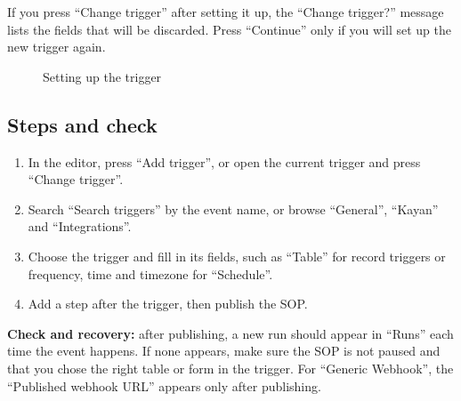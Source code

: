 \begin{rcwarn}
If you press “Change trigger” after setting it up, the “Change trigger?” message lists the fields that will be discarded. Press “Continue” only if you will set up the new trigger again.
\end{rcwarn}

\begin{figure}[H]
\centering
{}
\rclegend
\caption{Setting up the trigger}
\label{fig:builder-isop-triggers-flow}
\end{figure}

\subsection{Steps and check}
\begin{enumerate}
\item In the editor, press “Add trigger”, or open the current trigger and press “Change trigger”.
\item Search “Search triggers” by the event name, or browse “General”, “Kayan” and “Integrations”.
\item Choose the trigger and fill in its fields, such as “Table” for record triggers or frequency, time and timezone for “Schedule”.
\item Add a step after the trigger, then publish the SOP.
\end{enumerate}

\textbf{Check and recovery:} after publishing, a new run should appear in “Runs” each time the event happens. If none appears, make sure the SOP is not paused and that you chose the right table or form in the trigger. For “Generic Webhook”, the “Published webhook URL” appears only after publishing.

